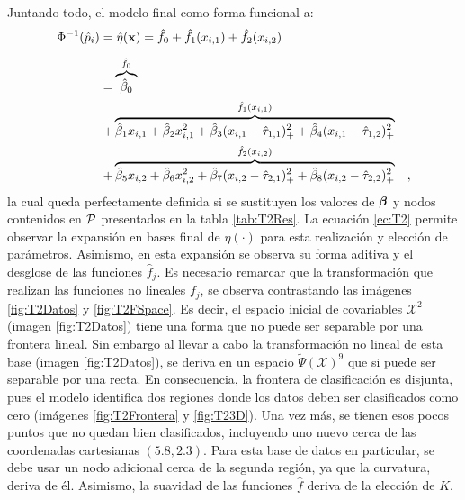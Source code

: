 \documentclass[../Main/Main.tex]{subfiles}
\begin{document}
Juntando todo, el modelo final como forma funcional a:
\begin{align}
	\Phi^{-1}(\hat{p}_i) = &\; \hat{\eta}(\xsn) = \hat{f}_0 + \hat{f}_1(x_{i,1}) +  \hat{f}_2(x_{i,2}) \label{ec:T2}\\[5pt]	
	= & \overbrace{\hat{\beta}_0}^{\hat{f}_0} \nonumber \\ 
	+ & \overbrace{\hat{\beta}_1x_{i,1} + \hat{\beta}_2x_{i,1}^2 
+ \hat{\beta}_3(x_{i,1} - \hat{\t}_{1,1})_+^2 + \hat{\beta}_4(x_{i,1} - \hat{\t}_{1,2})_+^2}^{\hat{f}_1(x_{i,1})} \nonumber \\
	+ & \overbrace{\hat{\beta}_5x_{i,2} + \hat{\beta}_6x_{i,2}^2 
+ \hat{\beta}_7(x_{i,2} - \hat{\t}_{2,1})_+^2 + \hat{\beta}_8(x_{i,2} - \hat{\t}_{2,2})_+^2}^{\hat{f}_2(x_{i,2})}\quad, \nonumber
\end{align}
la cual queda perfectamente definida si se sustituyen los valores de $\betabf$ y nodos contenidos en $\P$ presentados en la tabla \ref{tab:T2Res}. La ecuación \eqref{ec:T2} permite observar la expansión en bases final de $\eta(\cdot)$ para esta realización y elección de parámetros. Asimismo, en esta expansión se observa su forma aditiva y el desglose de las funciones $\hat{f}_j$. Es necesario remarcar que la transformación que realizan las funciones no lineales $f_j$, se observa contrastando las imágenes \ref{fig:T2Datos} y \ref{fig:T2FSpace}. Es decir, el espacio inicial de covariables $\mathcal{X}^2$ (imagen \ref{fig:T2Datos}) tiene una forma que no puede ser separable por una frontera lineal. Sin embargo al llevar a cabo la transformación no lineal de esta base (imagen \ref{fig:T2Datos}), se deriva en un espacio $\widetilde{\Psi}(\mathcal{X})^{9}$ que si puede ser separable por una recta. En consecuencia, la frontera de clasificación es disjunta, pues el modelo identifica dos regiones donde los datos deben ser clasificados como cero (imágenes \ref{fig:T2Frontera} y \ref{fig:T23D}). Una vez más, se tienen esos pocos puntos que no quedan bien clasificados, incluyendo uno nuevo cerca de las coordenadas cartesianas $(5.8, 2.3)$. Para esta base de datos en particular, se debe usar un nodo adicional cerca de la segunda región, ya que la curvatura, deriva de él. Asimismo, la suavidad de las funciones $\hat{f}$ deriva de la elección de $K$.
\end{document}
